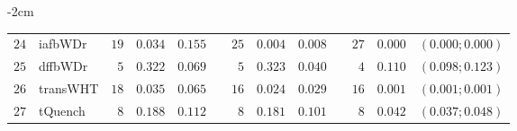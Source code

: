 \begin{table*}[!htbp]
\begin{adjustwidth*}{}{-2cm}
\begin{tabular}{@{}rlrrrrrrrrrcc@{}}
\footnotesize{$24$} & \footnotesize{iafbWDr  } & \footnotesize{$19$} & \footnotesize{$0.034$} & \footnotesize{$0.155$} && \footnotesize{$25$} & \footnotesize{$0.004$} & \footnotesize{$0.008$} && \footnotesize{$27$} & \footnotesize{$0.000$} & \footnotesize{$(0.000;0.000)$} \\
\footnotesize{$25$} & \footnotesize{dffbWDr  } & \footnotesize{$5 $} & \footnotesize{$0.322$} & \footnotesize{$0.069$} && \footnotesize{$5 $} & \footnotesize{$0.323$} & \footnotesize{$0.040$} && \footnotesize{$4 $} & \footnotesize{$0.110$} & \footnotesize{$(0.098;0.123)$} \\
\footnotesize{$26$} & \footnotesize{transWHT } & \footnotesize{$18$} & \footnotesize{$0.035$} & \footnotesize{$0.065$} && \footnotesize{$16$} & \footnotesize{$0.024$} & \footnotesize{$0.029$} && \footnotesize{$16$} & \footnotesize{$0.001$} & \footnotesize{$(0.001;0.001)$} \\
\footnotesize{$27$} & \footnotesize{tQuench  } & \footnotesize{$8 $} & \footnotesize{$0.188$} & \footnotesize{$0.112$} && \footnotesize{$8 $} & \footnotesize{$0.181$} & \footnotesize{$0.101$} && \footnotesize{$8 $} & \footnotesize{$0.042$} & \footnotesize{$(0.037;0.048)$} \\
\bottomrule
\end{tabular}
\end{adjustwidth*}
\end{table*}

